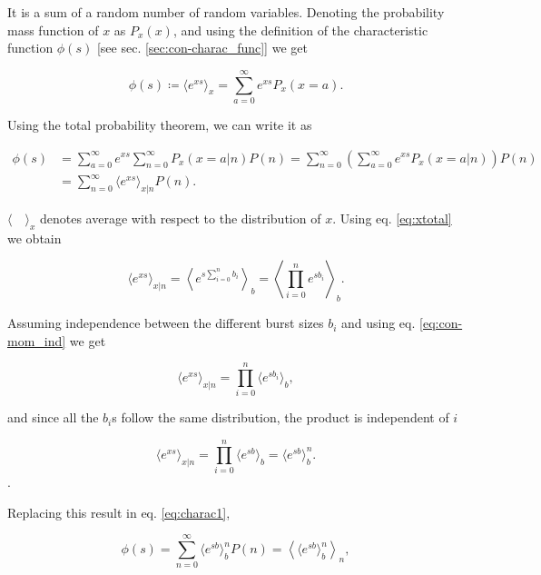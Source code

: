 It is a sum of a random number of random variables. Denoting the probability mass function of $x$ as $P_x(x)$, and using the definition of the characteristic function $\phi(s)$ [see sec. \ref{sec:con-charac_func}] we get

\begin{equation*}
  \phi(s) \coloneqq \langle e^{xs}\rangle_x = \sum_{a=0}^\infty e^{xs}P_x(x=a).
\end{equation*}

Using the total probability theorem, we can write it as

\begin{equation}
  \label{eq:charac1}
  \begin{split}
    \phi(s) &= \sum_{a=0}^\infty e^{xs}\sum_{n=0}^\infty P_x(x=a|n)P(n) = \sum_{n=0}^\infty\left(\sum_{a=0}^\infty e^{xs}P_x(x=a|n)\right)P(n)\\ 
&= \sum_{n=0}^\infty \langle e^{xs}\rangle_{x|n} P(n).
  \end{split}
\end{equation}

$\langle\quad\rangle_x$ denotes average with respect to the distribution of $x$. Using eq. \eqref{eq:xtotal} we obtain

\begin{equation*}
  \langle e^{xs}\rangle_{x|n} = \left\langle e^{s\sum_{i=0}^nb_i} \right\rangle_b = \left\langle \prod_{i=0}^ne^{sb_i}\right\rangle_b.
\end{equation*}

Assuming independence between the different burst sizes $b_i$ and using eq. \eqref{eq:con-mom_ind} we get

\begin{equation*}
  \langle e^{xs}\rangle_{x|n} =  \prod_{i=0}^n\langle e^{sb_i}\rangle_b,
\end{equation*}

and since all the $b_i$s follow the same distribution, the product is independent of $i$

\begin{equation*}
  \langle e^{xs}\rangle_{x|n} = \prod_{i=0}^n\langle e^{sb}\rangle_b = \langle e^{sb}\rangle_b^n.
\end{equation*}.

Replacing this result in eq. \eqref{eq:charac1},

\begin{equation*}
  \phi(s) = \sum_{n=0}^\infty \langle e^{sb}\rangle_b^n P(n) = \left\langle\langle e^{sb}\rangle_b^n\right\rangle_n,
\end{equation*}


